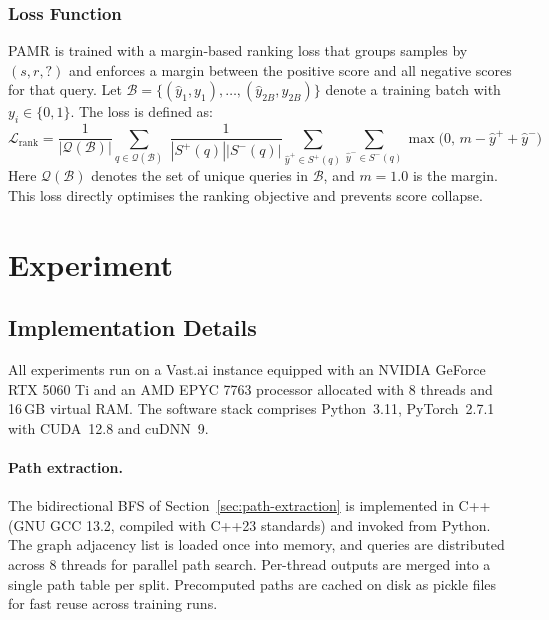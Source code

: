 \documentclass[runningheads]{llncs}
\begin{document}
\subsubsection{Loss Function}
\label{sec:loss-functions}

PAMR is trained with a margin-based ranking loss that groups samples
by $(s, r, ?)$ and enforces a margin between the positive score
and all negative scores for that query. Let $\mathcal{B} = \{(\hat{y}_1, y_1), \ldots, (\hat{y}_{2B}, y_{2B})\}$
denote a training batch with $y_i \in \{0, 1\}$. The loss is defined as:
\begin{equation}
  \mathcal{L}_{\text{rank}} = \frac{1}{|\mathcal{Q}(\mathcal{B})|} \sum_{q \in \mathcal{Q}(\mathcal{B})}\; \frac{1}{|S^+(q)||S^-(q)|} \sum_{\hat{y}^+ \in S^+(q)} \sum_{\hat{y}^- \in S^-(q)}
  \max\bigl(0,\, m - \hat{y}^+ + \hat{y}^-\bigr)
  \label{eq:loss-rank}
\end{equation}
Here $\mathcal{Q}(\mathcal{B})$ denotes the set of unique queries in $\mathcal{B}$, and
$m = 1.0$ is the margin. This loss directly optimises the ranking objective and prevents
score collapse.

\section{Experiment}
\label{sec:experiment}
\subsection{Implementation Details}
\label{sec:implementation}

All experiments run on a Vast.ai instance equipped with an NVIDIA
GeForce RTX 5060 Ti and an AMD EPYC 7763 processor allocated with 8 threads
and 16\,GB virtual RAM. The software stack comprises Python~3.11,
PyTorch~2.7.1 with CUDA~12.8 and cuDNN~9.

\paragraph{Path extraction.}
The bidirectional BFS of Section~\ref{sec:path-extraction} is
implemented in C++ (GNU GCC 13.2, compiled with C++23 standards)
and invoked from Python. The graph adjacency list is loaded once
into memory, and queries are distributed across 8 threads for
parallel path search. Per-thread outputs are merged into a single
path table per split. Precomputed paths are cached on disk as
pickle files for fast reuse across training runs.
\end{document}
